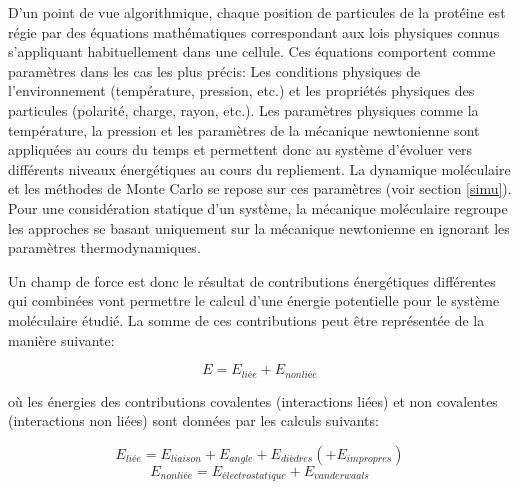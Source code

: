 D'un point de vue algorithmique, chaque position de particules de la protéine est régie par des équations mathématiques correspondant aux lois physiques connus s'appliquant habituellement dans une cellule. Ces équations comportent comme paramètres dans les cas les plus précis: Les conditions physiques de l'environnement (température, pression, etc.) et les propriétés physiques des particules (polarité, charge, rayon, etc.). Les paramètres physiques comme la température, la pression et les paramètres de la mécanique newtonienne sont appliquées au cours du temps et permettent donc au système d'évoluer vers différents niveaux énergétiques au cours du repliement. La dynamique moléculaire et les méthodes de Monte Carlo se repose sur ces paramètres (voir section \ref{simu}). 
Pour une considération statique d'un système, la mécanique moléculaire regroupe les approches se basant uniquement sur la mécanique newtonienne en ignorant les paramètres thermodynamiques.

Un champ de force est donc le résultat de contributions énergétiques différentes qui combinées vont permettre le calcul d'une énergie potentielle pour le système moléculaire étudié. La somme de ces contributions peut  être représentée de la manière suivante:

$$E = E_{liée} + E_{nonliée}$$

où les énergies des contributions covalentes (interactions liées) et non covalentes (interactions non liées) sont données par les calculs suivants:

$$E_{liée} = E_{liaison} + E_{angle} + E_{dièdres} (+ E_{impropres})$$
$$E_{nonliée} = E_{électrostatique} + E_{vanderwaals}$$

